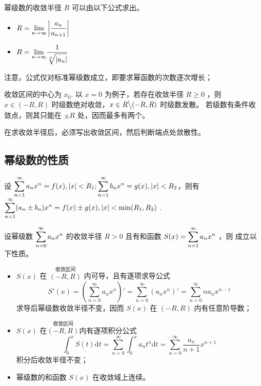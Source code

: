 幂级数的收敛半径 $ R $ 可以由以下公式求出。

\begin{itemize}
    \item $ \displaystyle R = {\displaystyle\lim_{n\rightarrow \infty}}\left|\dfrac{a_n}{a_{n+1}}\right| $ 
    \item $ \displaystyle R = {\displaystyle\lim_{n\rightarrow \infty}}\dfrac{1}{\displaystyle\sqrt[n]{|a_n|}} $ 
\end{itemize}

注意，公式仅对标准幂级数成立，即要求幂函数的次数逐次增长；

收敛区间的中心为 $ x_0 $. 以 $ x = 0 $ 为例子，若存在收敛半径 $ R\geq 0 $ ，则
$ x\in (-R,R) $ 时级数绝对收敛，$ x\in R\big\backslash(-R,R) $ 时级数发散。
若级数有条件收敛点，则其只能在 $ \pm R $ 处，因而最多有两个。

在求收敛半径后，必须写出收敛区间，然后判断端点处敛散性。

\subsection{幂级数的性质}


设 $ \displaystyle \sum_{n=1}^\infty a_nx^n = f(x),|x|< R_1;\sum_{n=1}^\infty b_nx^n = g(x), |x|< R_2 $，则有
$ \displaystyle \sum_{n=1}^\infty (a_n\pm b_n)x^n = f(x)\pm g(x), |x|<\min(R_1,R_2)  $ .


设幂级数 $ \displaystyle \sum_{n=0}^\infty a_nx^n $ 的收敛半径 $ R>0 $ 且有和函数 $ \displaystyle S(x) = \sum_{n=1}^\infty a_nx^n $ ，则
成立以下性质。
\begin{itemize}
    \item $ S(x) $ 在 $ \overset{\textrm{收敛区间}}{(-R,R)} $ 内可导，且有逐项求导公式$$
        S'(x) = \left(\sum_{n=0}^\infty a_nx^n\right)' = \sum_{n=0}^\infty (a_nx^n)' = \sum_{n=0}^\infty na_nx^{n-1}
    $$ 
    求导后幂级数收敛半径不变，因而 $ S(x) $ 在 $ (-R,R) $ 内有任意阶导数；
    \item $ S(x) $ 在$ \overset{\textrm{收敛区间}}{(-R,R)} $内有逐项积分公式$$
        \int_0^x S(t)\mathrm{d}t = \sum_{n=0}^\infty\int_0^x a_nt^n\mathrm{d}t = \sum_{n=0}^\infty \dfrac{a_n}{n+1}x^{n+1}
    $$ 
    积分后收敛半径不变；
    \item 幂级数的和函数 $ S(x) $ 在收敛域上连续。
\end{itemize}


